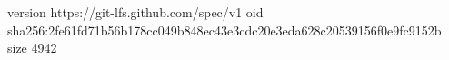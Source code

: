 version https://git-lfs.github.com/spec/v1
oid sha256:2fe61fd71b56b178cc049b848ec43e3cdc20e3eda628c20539156f0e9fc9152b
size 4942
